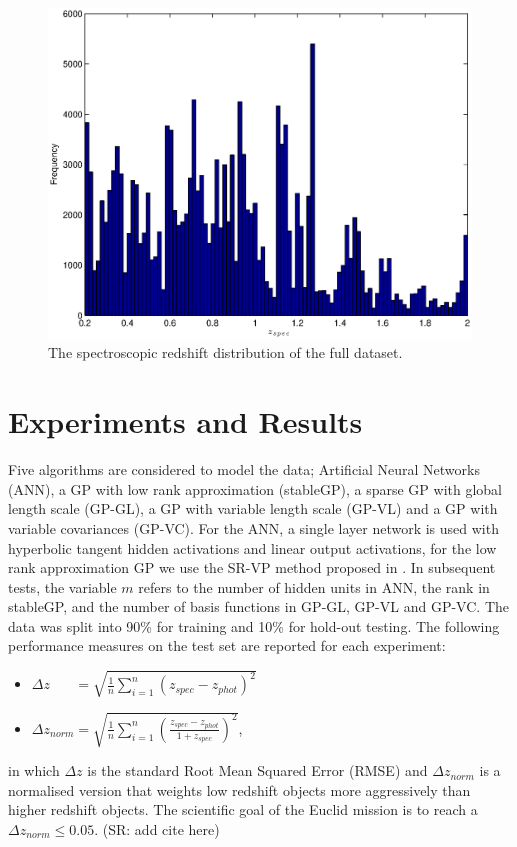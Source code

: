 \documentclass[useAMS,usenatbib,fleqn]{mn2e}
\begin{document}
\begin{figure}
       \centering
       \includegraphics[width=\columnwidth]{figures/zspec.eps}
        \caption{The spectroscopic redshift distribution of the full dataset.}
       \label{fig-zspec-hostogram}
\end{figure}

\section{Experiments and Results}
\label{sec-experiments}

Five algorithms are considered to model the data; Artificial Neural Networks (ANN), a GP with low rank approximation (stableGP), a sparse GP with global length scale (GP-GL), a GP with variable length scale (GP-VL) and a GP with variable covariances (GP-VC). For the ANN, a single layer network is used with hyperbolic tangent hidden activations and linear output activations, for the low rank approximation GP we use the SR-VP method proposed in \citep{foster2009}. In subsequent tests, the variable $m$ refers to the number of hidden units in ANN, the rank in stableGP, and the number of basis functions in GP-GL, GP-VL and GP-VC. The data was split into 90\% for training and 10\% for hold-out testing. The following performance measures on the test set are reported for each experiment:
\begin{itemize}
  \item $\Delta z_{\phantom{norm}} = \sqrt{\frac{1}{n}\sum_{i=1}^{n}\left(z_{spec}-z_{phot}\right)^{2}}$
  \item $\Delta z_{norm} = \sqrt{\frac{1}{n}\sum_{i=1}^{n}\left(\frac{z_{spec}-z_{phot}}{1+z_{spec}}\right)^{2}}$,
\end{itemize}
in which $\Delta z$ is the standard Root Mean Squared Error (RMSE) and $\Delta z_{norm}$ is a normalised version that weights low redshift objects more aggressively than higher redshift objects. The scientific goal of the Euclid mission is to reach a $\Delta z_{norm} \le 0.05$. (SR: add cite here)
\end{document}

